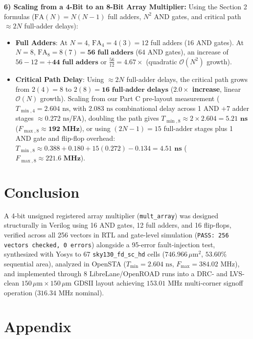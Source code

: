 \documentclass[conference,10pt]{IEEEtran}
\begin{document}
\textbf{6) Scaling from a 4-Bit to an 8-Bit Array Multiplier:}
Using the Section 2 formulas ($\text{FA}(N) = N(N-1)$ full adders, $N^2$ AND gates, and critical path $\approx 2N$ full-adder delays):
\begin{itemize}
    \item \textbf{Full Adders}: At $N = 4$, $\text{FA}_4 = 4(3) = 12$ full adders ($16$ AND gates). At $N = 8$, $\text{FA}_8 = 8(7) = \mathbf{56\text{ full adders}}$ ($64$ AND gates), an increase of $56 - 12 = \mathbf{+44\text{ full adders}}$ or $\frac{56}{12} = \mathbf{4.67\times}$ (quadratic $\mathcal{O}(N^2)$ growth).
    \item \textbf{Critical Path Delay}: Using $\approx 2N$ full-adder delays, the critical path grows from $2(4) = 8$ to $2(8) = \mathbf{16\text{ full-adder delays}}$ (\textbf{$2.0\times$ increase}, linear $\mathcal{O}(N)$ growth). Scaling from our Part C pre-layout measurement ($T_{\min,4} = 2.604\text{ ns}$, with $2.083\text{ ns}$ combinational delay across 1 AND $+ 7$ adder stages $\approx 0.272\text{ ns}$/FA), doubling the path gives $T_{\min,8} \approx 2 \times 2.604 = \mathbf{5.21\text{ ns}}$ ($F_{\max,8} \approx \mathbf{192\text{ MHz}}$), or using $(2N-1) = 15$ full-adder stages plus 1 AND gate and flip-flop overhead: $T_{\min,8} \approx 0.388 + 0.180 + 15(0.272) - 0.134 = \mathbf{4.51\text{ ns}}$ ($F_{\max,8} \approx \mathbf{221.6\text{ MHz}}$).
\end{itemize}

\section{Conclusion}
A 4-bit unsigned registered array multiplier (\texttt{mult\_array}) was designed structurally in Verilog using 16 AND gates, 12 full adders, and 16 flip-flops, verified across all 256 vectors in RTL and gate-level simulation (\texttt{PASS: 256 vectors checked, 0 errors}) alongside a 95-error fault-injection test, synthesized with Yosys to 67 \texttt{sky130\_fd\_sc\_hd} cells ($746.966\,\mu\text{m}^2$, $53.60\%$ sequential area), analyzed in OpenSTA ($T_{\min} = 2.604\text{ ns}$, $F_{\max} = 384.02\text{ MHz}$), and implemented through 8 LibreLane/OpenROAD runs into a DRC- and LVS-clean $150\,\mu\text{m} \times 150\,\mu\text{m}$ GDSII layout achieving $153.01\text{ MHz}$ multi-corner signoff operation ($316.34\text{ MHz}$ nominal).

\section*{Appendix}
\end{document}
